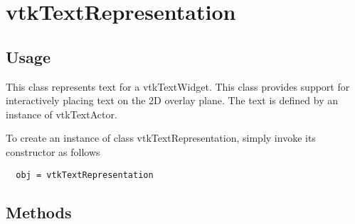 \section{vtkTextRepresentation}

\subsection{Usage}

 This class represents text for a vtkTextWidget.  This class provides
 support for interactively placing text on the 2D overlay plane. The text
 is defined by an instance of vtkTextActor.

To create an instance of class vtkTextRepresentation, simply
invoke its constructor as follows
\begin{verbatim}
  obj = vtkTextRepresentation
\end{verbatim}
\subsection{Methods}

